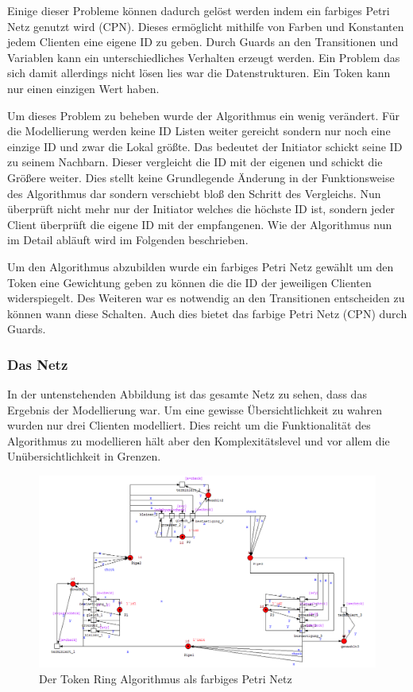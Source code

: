 Einige dieser Probleme können dadurch gelöst werden indem ein farbiges Petri Netz genutzt wird (CPN). Dieses ermöglicht mithilfe von Farben und Konstanten jedem Clienten eine eigene ID zu geben. Durch Guards an den Transitionen und Variablen kann ein unterschiedliches Verhalten erzeugt werden. Ein Problem das sich damit allerdings nicht lösen lies war die Datenstrukturen. Ein Token kann nur einen einzigen Wert haben.

Um dieses Problem zu beheben wurde der Algorithmus ein wenig verändert. Für die Modellierung werden keine ID Listen weiter gereicht sondern nur noch eine einzige ID und zwar die Lokal größte. Das bedeutet der Initiator schickt seine ID zu seinem Nachbarn. Dieser vergleicht die ID mit der eigenen und schickt die Größere weiter. Dies stellt keine Grundlegende Änderung in der Funktionsweise des Algorithmus dar sondern verschiebt bloß den Schritt des Vergleichs. Nun überprüft nicht mehr nur der Initiator welches die höchste ID ist, sondern jeder Client überprüft die eigene ID mit der empfangenen. Wie der Algorithmus nun im Detail abläuft wird im Folgenden beschrieben.

Um den Algorithmus abzubilden wurde ein farbiges Petri Netz gewählt um den Token eine Gewichtung geben zu können die die ID der jeweiligen Clienten widerspiegelt. Des Weiteren war es notwendig an den Transitionen entscheiden zu können wann diese Schalten. Auch dies bietet das farbige Petri Netz (CPN) durch Guards.



\subsubsection{Das Netz}
In der untenstehenden Abbildung ist das gesamte Netz zu sehen, dass das Ergebnis der Modellierung war. Um eine gewisse Übersichtlichkeit zu wahren wurden nur drei Clienten modelliert. Dies reicht um die Funktionalität des Algorithmus zu modellieren hält aber den Komplexitätslevel und vor allem die Unübersichtlichkeit in Grenzen. 


\begin{figure}[H]
\centering
\includegraphics[width=1\linewidth]{kapitel/hauptteil/img/cpn}
\caption{Der Token Ring Algorithmus als farbiges Petri Netz}
\label{fig:cpn}
\end{figure}

